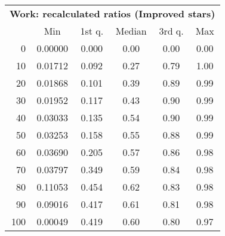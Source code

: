 \begin{tabular}{r|ccccc}
  \multicolumn{6}{c}{{\bf Work: recalculated ratios (Improved stars)}} \\
  & Min & 1st q. & Median & 3rd q. & Max \\ \hline\hline
  0 & 0.00000 & 0.000 & 0.00 & 0.00 & 0.00
\\ 10 & 0.01712 & 0.092 & 0.27 & 0.79 & 1.00
\\ 20 & 0.01868 & 0.101 & 0.39 & 0.89 & 0.99
\\ 30 & 0.01952 & 0.117 & 0.43 & 0.90 & 0.99
\\ 40 & 0.03033 & 0.135 & 0.54 & 0.90 & 0.99
\\ 50 & 0.03253 & 0.158 & 0.55 & 0.88 & 0.99
\\ 60 & 0.03690 & 0.205 & 0.57 & 0.86 & 0.98
\\ 70 & 0.03797 & 0.349 & 0.59 & 0.84 & 0.98
\\ 80 & 0.11053 & 0.454 & 0.62 & 0.83 & 0.98
\\ 90 & 0.09016 & 0.417 & 0.61 & 0.81 & 0.98
\\ 100 & 0.00049 & 0.419 & 0.60 & 0.80 & 0.97
\end{tabular}

